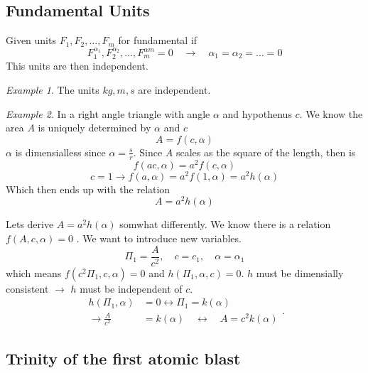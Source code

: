 \documentclass{article}
\theoremstyle{remark}
\newtheorem{example}{Example}
\begin{document}
\subsection{Fundamental Units}%
\label{sub:fundamental_units}

Given units $F_{1}, F_{2}, \ldots , F_{m}$ for fundamental if \[
  F_{1}^{\alpha_1}, F_{2}^{\alpha_2}, \ldots , F_{m}^{\alpha m} = 0 \quad  \to \quad  \alpha_1 = \alpha_{2} = \ldots = 0   
\] 
This units are then independent.
\begin{example}
  The units $kg, m, s$ are independent.  
\end{example}
\begin{example}
  In a right angle triangle with angle $\alpha $ and hypothenus $c$. We know the area $A$ is uniquely determined by $\alpha $ and $c$ \[
  A = f\left( c,\alpha  \right)
  \] 
  $\alpha $ is dimensialless since  $\alpha  = \frac{s}{r}$. Since $A$ scales as the square of the length, then is \[
  f\left( ac, \alpha  \right) = a^2f\left( c,\alpha  \right)
  \]   
  \[
    c = 1 \to f\left( a, \alpha  \right) = a^2f\left( 1,\alpha  \right) = a^2h\left( \alpha  \right)
  \] 
  Which then ends up with the relation \[
  A = a^2h\left( \alpha  \right)
  \] 
\end{example} 



Lets derive $A = a ^2 h\left( \alpha   \right)$ somwhat differently. We know there is a relation $f\left( A, c, \alpha  \right) = 0$ . We want to introduce new variables.\[
\Pi_1 = \frac{A}{c^2}, \quad  c = c_1, \quad \alpha = \alpha _1   
\] 
which means $f\left( c^2 \Pi_1, c, \alpha   \right) = 0$  and $h\left( \Pi_1, \alpha , c \right) = 0$. $h$ must be dimensially consistent $\to$ $h$ must be independent of $c$. 
\begin{equation*}
  \begin{split}
    h\left( \Pi_1, \alpha  \right) &= 0 \leftrightarrow \Pi_1 = k\left( \alpha  \right) \\
    \to  \frac{A}{c^2} &= k\left( \alpha  \right) \quad   \leftrightarrow \quad A = c^2k\left( \alpha  \right) 
  \end{split}
.\end{equation*}

\subsection{Trinity of the first atomic blast}%
\label{sub:trinity_of_the_first_atomic_blast}
\end{document}
